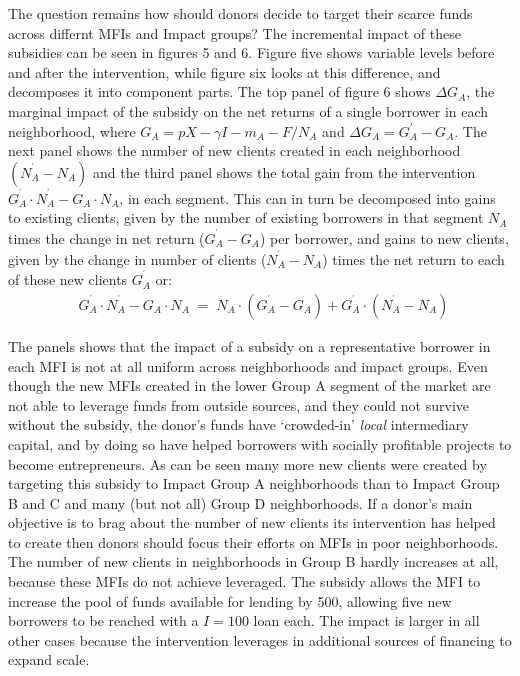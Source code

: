 \documentclass{article} %
\begin{document}
The question remains how should donors decide to target their scarce funds across differnt MFIs and Impact groups?   The incremental impact of these subsidies can be seen in figures 5 and 6.  Figure five shows variable levels before and after the intervention, while figure six looks at this difference, and decomposes it into component parts.  The top panel of figure 6 shows $\Delta G_{A} $, the marginal impact of the subsidy on the net returns of a single borrower in each neighborhood, where $G_{A} =pX-\gamma I-m_{A} -F/N_{A} $ and $\Delta G_{A} =G_{A}^{{'} } -G_{A} .$  The next panel shows the number of new clients created in each neighborhood $(N_{A}^{{}^{{'} } } -N_{A} )$ and the third panel shows the total gain from the intervention $G_{A}^{{}^{{'} } } \cdot N_{A}^{{}^{{'} } } -G_{A} \cdot N_{A} $, in each segment. This can in turn be decomposed into gains to existing clients, given by the number of existing borrowers in that segment $N_{A} $ times the change in net return ($G_{A}^{{}^{{'} } } -G_{A} $) per borrower, and gains to new clients, given by the change in number of clients ($N_{A}^{{}^{{'} } } -N_{A} $) times the net return to each of these new clients $G_{A}^{{}^{{'} } } $ or:
\[\begin{array}{l} {\phantom{.} \phantom{.} G_{A}^{{}^{{'} } } \cdot N_{A}^{{}^{{'} } } -G_{A} \cdot N_{A} }  {\phantom{.} =\phantom{.} N_{A} \cdot (G_{A}^{{}^{{'} } } -G_{A} )+G_{A}^{{}^{{'} } } \cdot (N_{A}^{{}^{{'} } } -N_{A} )} \end{array}\] 

The panels shows that the impact of a subsidy on a representative borrower in each MFI is not at all uniform across neighborhoods and impact groups. Even though the new MFIs created in the lower Group A segment of the market are not able to leverage funds from outside sources, and they could not survive without the subsidy, the donor's funds have `crowded-in' \textit{local} intermediary capital, and by doing so have helped borrowers with socially profitable projects to become entrepreneurs. As can be seen many more new clients were created by targeting this subsidy to Impact Group A neighborhoods than to Impact Group B and C and many (but not all) Group D neighborhoods. If a donor's main objective is to brag about the number of new clients its intervention has helped to create then donors should focus their efforts on MFIs in poor neighborhoods.  The number of new clients in neighborhoods in Group B hardly increases at all, because these MFIs do not achieve leveraged.  The subsidy allows the MFI to increase the pool of funds available for lending by 500, allowing five new borrowers to be reached with a $I=100$ loan each.  The impact is larger in all other cases because the intervention leverages in additional sources of financing to expand scale. 
\end{document}
